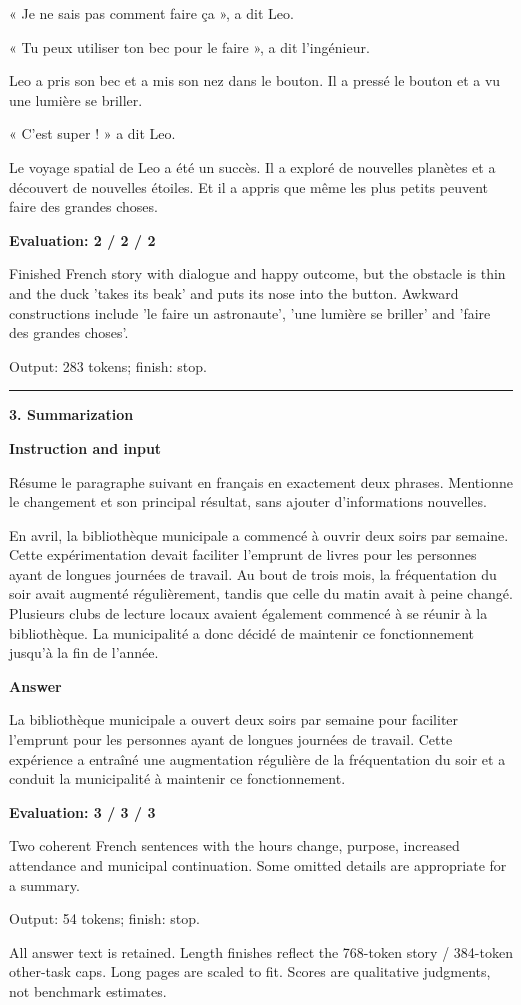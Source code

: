 \documentclass[10pt]{article}
\begin{document}
{\begin{minipage}{\textwidth}
\par\smallskip
« Je ne sais pas comment faire ça », a dit Leo.
\par\smallskip
« Tu peux utiliser ton bec pour le faire », a dit l'ingénieur.
\par\smallskip
Leo a pris son bec et a mis son nez dans le bouton. Il a pressé le bouton et a vu une lumière se briller.
\par\smallskip
« C'est super ! » a dit Leo.
\par\smallskip
Le voyage spatial de Leo a été un succès. Il a exploré de nouvelles planètes et a découvert de nouvelles étoiles. Et il a appris que même les plus petits peuvent faire des grandes choses.\par\smallskip
\textbf{Evaluation: 2 / 2 / 2}\par Finished French story with dialogue and happy outcome, but the obstacle is thin and the duck 'takes its beak' and puts its nose into the button. Awkward constructions include 'le faire un astronaute', 'une lumière se briller' and 'faire des grandes choses'.
\par {\color{gray} Output: 283 tokens; finish: stop.}\par
\medskip\hrule\smallskip
{\bfseries 3. Summarization}\par\smallskip
\textbf{Instruction and input}\par Résume le paragraphe suivant en français en exactement deux phrases. Mentionne le changement et son principal résultat, sans ajouter d'informations nouvelles.
\par\smallskip
En avril, la bibliothèque municipale a commencé à ouvrir deux soirs par semaine. Cette expérimentation devait faciliter l'emprunt de livres pour les personnes ayant de longues journées de travail. Au bout de trois mois, la fréquentation du soir avait augmenté régulièrement, tandis que celle du matin avait à peine changé. Plusieurs clubs de lecture locaux avaient également commencé à se réunir à la bibliothèque. La municipalité a donc décidé de maintenir ce fonctionnement jusqu'à la fin de l'année.\par\smallskip
\textbf{Answer}\par La bibliothèque municipale a ouvert deux soirs par semaine pour faciliter l'emprunt pour les personnes ayant de longues journées de travail. Cette expérience a entraîné une augmentation régulière de la fréquentation du soir et a conduit la municipalité à maintenir ce fonctionnement.\par\smallskip
\textbf{Evaluation: 3 / 3 / 3}\par Two coherent French sentences with the hours change, purpose, increased attendance and municipal continuation. Some omitted details are appropriate for a summary.
\par {\color{gray} Output: 54 tokens; finish: stop.}\par
\medskip\footnotesize All answer text is retained. Length finishes reflect the 768-token story / 384-token other-task caps. Long pages are scaled to fit. Scores are qualitative judgments, not benchmark estimates.
\end{minipage}}%
\end{document}
